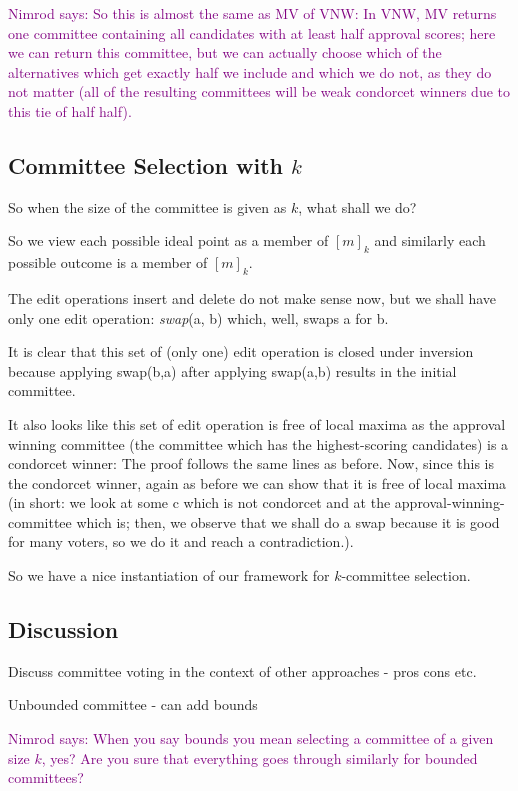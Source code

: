 \documentclass{llncs}
\newcommand{\nimrod}[1]{\textcolor{purple}{Nimrod says: #1}}
\begin{document}
\nimrod{So this is almost the same as MV of VNW:
  In VNW, MV returns one committee containing all candidates with at least half approval scores; here we can return this committee, but we can actually choose which of the alternatives which get exactly half we include and which we do not, as they do not matter (all of the resulting committees will be weak condorcet winners due to this tie of half half).}


\subsection{Committee Selection with $k$}

So when the size of the committee is given as $k$, what shall we do?

So we view each possible ideal point as a member of $[m]_k$ and similarly each possible outcome is a member of $[m]_k$.

The edit operations insert and delete do not make sense now, but we shall have only one edit operation: \emph{swap}(a, b) which, well, swaps a for b.

It is clear that this set of (only one) edit operation is closed under inversion because applying swap(b,a) after applying swap(a,b) results in the initial committee.

It also looks like this set of edit operation is free of local maxima as the approval winning committee (the committee which has the highest-scoring candidates) is a condorcet winner:
  The proof follows the same lines as before.
Now, since this is the condorcet winner, again as before we can show that it is free of local maxima (in short: we look at some c which is not condorcet and at the approval-winning-committee which is; then, we observe that we shall do a swap because it is good for many voters, so we do it and reach a contradiction.).

So we have a nice instantiation of our framework for $k$-committee selection.


\subsection{Discussion}

Discuss committee voting in the context of other approaches - pros cons etc.

Unbounded committee - can add bounds

\nimrod{When you say bounds you mean selecting a committee of a given size $k$, yes? Are you sure that everything goes through similarly for bounded committees?}
\end{document}
